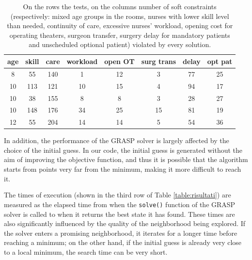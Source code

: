 \documentclass{article}
\begin{document}
\begin{table}[h!]
    \centering
    \begin{tabular}{|c|c|c|c|c|c|c|c|}
    \hline
    \textbf{age} & \textbf{skill} & \textbf{care} & \textbf{workload} & \textbf{open OT} & \textbf{surg trans} & \textbf{delay} & \textbf{opt pat}  \\ \hline
    8 & 55 & 140 & 1 & 12 & 3 & 77 & 25  \\ \hline
    10 & 113 & 121 & 10 & 15 & 4 & 94 & 17 \\ \hline
    10 & 38 & 155 & 8 & 8 & 3 & 28 & 27  \\ \hline
    10 & 148 & 176 & 34 & 25 & 15 & 81 & 19  \\ \hline
    12 & 55 & 204 & 14 & 14 & 5 & 54 & 36  \\ \hline
    \end{tabular}
    \caption{On the rows the tests, on the columns number of soft constraints (respectively: mixed age groups in the rooms, nurses with lower skill level than needed, continuity of care, excessive nurses' workload,
    opening cost for operating theaters, surgeon transfer, surgery delay for mandatory patients and unscheduled optional patient) violated by every solution.}
    \label{instances}
    \end{table}

In addition, the performance of the GRASP solver is largely affected by the choice of the initial guess. In our code, the initial guess is generated without the aim of improving the objective function, and thus it is possible that the algorithm starts from points very far from the minimum, making it more difficult to reach it.

The times of execution (shown in the third row of Table \ref{table:risultati}) are measured as the elapsed time from when the \verb+solve()+ function of the GRASP solver is called to when it returns the best state it has found. 
These times are also significantly influenced by the quality of the neighborhood being explored. If the solver enters a promising neighborhood, it iterates for a longer time before reaching a minimum; on the other hand, if the initial guess is already very close to a local minimum, the search time can be very short.
\end{document}
